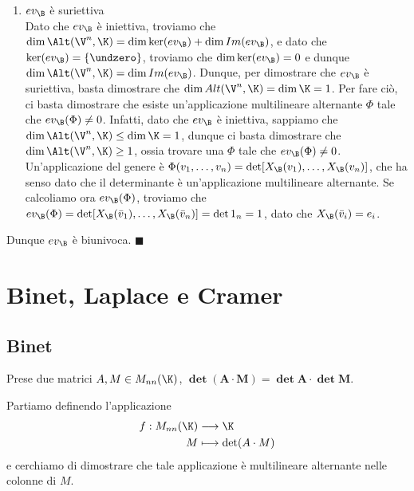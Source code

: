 \documentclass[11pt, a4paper, titlepage, oneside]{scrbook}
\begin{document}
\begin{enumerate}[label=\arabic*°]
\begin{enumerate}[label=\arabic*°]
        \item $ev_\B$ è suriettiva \\
        Dato che $ev_\B$ è iniettiva, troviamo che $\dim \Alt(\V^n, \K) = \dim \ker (ev_\B) + \dim Im (ev_\B)$, e dato che $\ker (ev_\B) = \{\undzero\}$, troviamo che $\dim \ker (ev_\B) = 0$ e dunque \mbox{$\dim \Alt(\V^n, \K) = \dim Im(ev_\B)$}. Dunque, per dimostrare che $ev_\B$ è suriettiva, basta dimostrare che $\dim Alt(\V^n, \K) = \dim \K = 1$. Per fare ciò, ci basta dimostrare che esiste un'applicazione multilineare alternante $\Phi$ tale che $ev_\B(\Phi) \neq 0$. Infatti, dato che $ev_\B$ è iniettiva, sappiamo che $\dim \Alt(\V^n, \K) \leq \dim \K = 1$, dunque ci basta dimostrare che $\dim \Alt(\V^n, \K) \geq 1$, ossia trovare una $\Phi$ tale che $ev_\B(\Phi) \neq 0$. Un'applicazione del genere è $\Phi(v_1, \ldots, v_n) = \det [X_\B(v_1), \ldots, X_\B(v_n)]$, che ha senso dato che il determinante è un'applicazione multilineare alternante. Se calcoliamo ora $ev_\B(\Phi)$, troviamo che \mbox{$ev_\B(\Phi) = \det [X_\B(\bar{v}_1), \ldots, X_\B(\bar{v}_n)] = \det 1_n = 1$}, dato che $X_\B(\bar{v}_i) = e_i$. 
    \end{enumerate}
    Dunque $ev_\B$ è biunivoca. $\blacksquare$
\end{enumerate}

\section{Binet, Laplace e Cramer}

\subsection{Binet}

\begin{Proposizione}
\label{teorema-binet}
Prese due matrici $A, M \in M_{nn}(\K)$, $\bm{\det (A \cdot M) = \det A \cdot \det M}$.
\end{Proposizione}

\Dimostrazione \nopagebreak

Partiamo definendo l'applicazione
\begin{align*}
f: M_{nn}(\K) &\longrightarrow \K \\
M &\longmapsto \det (A \cdot M)
\end{align*}
e cerchiamo di dimostrare che tale applicazione è multilineare alternante nelle colonne di $M$.
\end{document}
